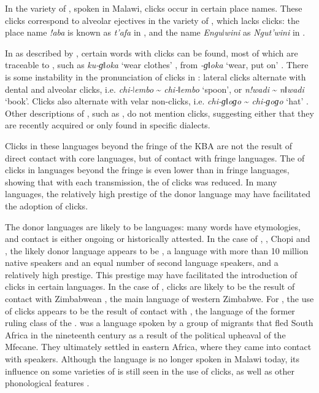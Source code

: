 \documentclass[output=paper
,newtxmath
,modfonts
,nonflat]{langsci/langscibook}
\begin{document}
In the  variety of , spoken in Malawi, clicks occur in certain place names. These clicks correspond to alveolar ejectives in the  variety of , which lacks clicks: the  place name \textit{!aba} is known as \textit{t’afa} in , and the  name \textit{Enguǀwini} as \textit{Ngut’wini} in  \citep{Moyo1995}. 

In  as described by \citet{Borland1970}, certain words with clicks can be found, most of which are traceable to , such as \textit{ku-ɡǁoka} ‘wear clothes’ \citep[32]{Borland1970}, from  \textit{-ɡǁoka} ‘wear, put on’ \citep[85]{Doke1958}. There is some instability in the pronunciation of clicks in : lateral clicks alternate with dental and alveolar clicks, i.e. \textit{chi-ǀembo} {\textasciitilde} \textit{chi-ǁembo} ‘spoon’, or \textit{n!wadi} {\textasciitilde} \textit{nǁwadi} ‘book’. Clicks also alternate with velar non-clicks, i.e. \textit{chi-ɡǁoɡo} {\textasciitilde} \textit{chi-ɡoɡo} ‘hat’ \citep[30]{Borland1970}. Other descriptions of , such as \citet{Doke1931}, do not mention clicks, suggesting either that they are recently acquired or only found in specific dialects. 

Clicks in these  languages beyond the fringe of the KBA are not the result of direct contact with core languages, but of contact with fringe languages. The  of clicks in  languages beyond the fringe is even lower than in fringe languages, showing that with each transmission, the  of clicks was reduced. In many languages, the relatively high prestige of the donor language may have facilitated the adoption of clicks. 

The donor languages are likely to be  languages: many  words have  etymologies, and contact is either ongoing or historically attested. In the case of , , Chopi and , the likely donor language appears to be , a language with more than 10 million native speakers and an equal number of second language speakers, and a relatively high prestige. This prestige may have facilitated the introduction of clicks in certain languages. In the case of , clicks are likely to be the result of contact with Zimbabwean , the main language of western Zimbabwe. For , the use of clicks appears to be the result of contact with , the language of the former ruling class of the .  was a  language spoken by a group of migrants that fled South Africa in the nineteenth century as a result of the political upheaval of the Mfecane. They ultimately settled in eastern Africa, where they came into contact with  speakers. Although the  language is no longer spoken in Malawi today, its influence on some varieties of  is still seen in the use of clicks, as well as other phonological features \citep{Moyo1995}. 
\end{document}
